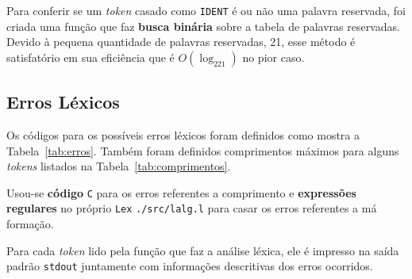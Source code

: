 Para conferir se um \textit{token} casado como \texttt{IDENT} é ou não uma palavra reservada, foi criada uma função que faz \textbf{busca binária} sobre a tabela de palavras reservadas. Devido à pequena quantidade de palavras reservadas, 21, esse método é satisfatório em sua eficiência que é $O(\log_221)$ no pior caso.

\subsection{Erros Léxicos}

Os códigos para os possíveis erros léxicos foram definidos como mostra a Tabela~\ref{tab:erros}. Também foram definidos comprimentos máximos para alguns \textit{tokens} listados na Tabela~\ref{tab:comprimentos}.

Usou-se \textbf{código} \texttt{C} para os erros referentes a comprimento e \textbf{expressões regulares} no próprio \texttt{Lex} \texttt{./src/lalg.l} para casar os erros referentes a má formação.

Para cada \textit{token} lido pela função que faz a análise léxica, ele é impresso na saída padrão \texttt{stdout} juntamente com informações descritivas dos erros ocorridos.

